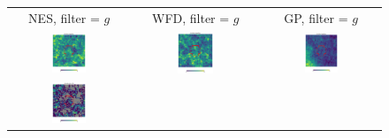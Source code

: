 \documentclass[preprintm,linenumbers]{aastex631}
\begin{document}
  	\begin{figure}
			\centering
			\begin{tabular}{  c c c}
                 NES, filter = $g$ & WFD, filter = $g$ & GP, filter = $g$ \\
				\includegraphics[width=0.3\textwidth]{results/skymaps_cutout/skymaps_cutout_first_year_one_snap_v4_0_10yrs_db_noDD_noTwi_nside-256_CountMetric_g_NES_noDD_noTwi.pdf} &
				\includegraphics[width=0.3\textwidth]{results/skymaps_cutout/skymaps_cutout_first_year_one_snap_v4_0_10yrs_db_noDD_noTwi_nside-256_CountMetric_g_WFD_noDD_noTwi.pdf} &
				\includegraphics[width=0.3\textwidth]{results/skymaps_cutout/skymaps_cutout_first_year_one_snap_v4_0_10yrs_db_noDD_noTwi_nside-256_CountMetric_g_GP_noDD_noTwi.pdf} \\
				\includegraphics[width=0.3\textwidth]{results/skymaps_cutout/skymaps_cutout_first_year_one_snap_v4_0_10yrs_db_noDD_noTwi_tscale-7_nside-256_doAllTemplateMetrics_reduceCount_g_NES_noDD_noTwi.pdf} &

\end{tabular}
\end{figure}
\end{document}
